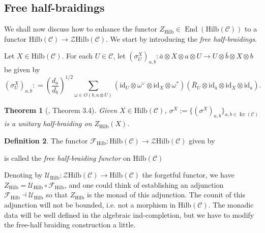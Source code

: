 \documentclass[a4paper,11pt,reqno]{amsart}
\numberwithin{equation}{section}
\newtheorem{theorem}{Theorem}[section]
\theoremstyle{remark}
\theoremstyle{definition}
\newtheorem{definition}[theorem]{Definition}
\newcommand{\cC}{\mathcal C}
\newcommand{\cF}{\mathcal F}
\newcommand{\cU}{\mathcal U}
\newcommand{\cZ}{\mathcal Z}
\DeclareMathOperator{\End}{End}
\DeclareMathOperator{\Irr}{Irr}
\newcommand{\id}{\mathrm{id}}
\newcommand{\Hilb}{\mathrm{Hilb}}
\begin{document}
\subsection{Free half-braidings}
We shall now discuss how to enhance the functor $Z_{\Hilb} \in \End(\Hilb(\cC))$ to a functor $\Hilb(\cC) \to \cZ \Hilb(\cC)$. We start by introducing the {\em free half-braidings}.

Let $X \in \Hilb(\cC)$. For each $U \in \cC$, let $(\sigma^X_U)_{a,b}: \bar{a} \otimes X \otimes a \otimes U \to U \otimes\bar{b} \otimes X \otimes b$ be given by
\[
(\sigma^X_U)_{a,b} : = \left( \frac{d_a}{d_b} \right)^{1/2} \sum_{\omega \in O(b,a \otimes U)} (\id_U \otimes \omega^\vee \otimes \id_X\otimes \omega^*) (\bar{R}_U \otimes \id_{\bar{a}} \otimes \id_X \otimes \id_{a}).
\]

\begin{theorem}[\cite{MR3509018}, Theorem 3.4]
	Given $X \in \Hilb(\cC)$, $\sigma^X := \{ (\sigma^X)_{a,b}\}_{a,b \in \Irr(\cC)}$ is a unitary half-braiding on $Z_{\Hilb}(X)$. 
	\label{thm:freehalfbraiding}
\end{theorem}

\begin{definition}
	The functor $\cF_{\Hilb}: \Hilb(\cC) \to \cZ\Hilb(\cC)$ given by
	\begin{center}
	\end{center}
	is called the {\em free half-braiding functor} on $\Hilb(\cC)$
	\label{def:freehalfbraidingfunctor}
\end{definition}
\medskip

Denoting by $\cU_{\Hilb}: \cZ \Hilb(\cC) \to \Hilb(\cC)$ the forgetful functor, we have $Z_{\Hilb} = \cU_{\Hilb} \circ \cF_{\Hilb}$, and one could think of establishing an adjunction $\cF_{\Hilb} \dashv \cU_{\Hilb}$ so that $Z_{\Hilb}$ is the monad of this adjunction. The counit of this adjunction will not be bounded, i.e. not a morphism in $\Hilb(\cC)$. The monadic data will be well defined in the algebraic ind-completion, but we have to modify the free-half braiding construction a little.
\medskip
\end{document}
